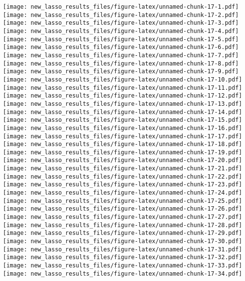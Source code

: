 \documentclass[
]{article}
\begin{document}
\texttt{[image: new\_lasso\_results\_files/figure-latex/unnamed-chunk-17-1.pdf]}
\texttt{[image: new\_lasso\_results\_files/figure-latex/unnamed-chunk-17-2.pdf]}
\texttt{[image: new\_lasso\_results\_files/figure-latex/unnamed-chunk-17-3.pdf]}
\texttt{[image: new\_lasso\_results\_files/figure-latex/unnamed-chunk-17-4.pdf]}
\texttt{[image: new\_lasso\_results\_files/figure-latex/unnamed-chunk-17-5.pdf]}
\texttt{[image: new\_lasso\_results\_files/figure-latex/unnamed-chunk-17-6.pdf]}
\texttt{[image: new\_lasso\_results\_files/figure-latex/unnamed-chunk-17-7.pdf]}
\texttt{[image: new\_lasso\_results\_files/figure-latex/unnamed-chunk-17-8.pdf]}
\texttt{[image: new\_lasso\_results\_files/figure-latex/unnamed-chunk-17-9.pdf]}
\texttt{[image: new\_lasso\_results\_files/figure-latex/unnamed-chunk-17-10.pdf]}
\texttt{[image: new\_lasso\_results\_files/figure-latex/unnamed-chunk-17-11.pdf]}
\texttt{[image: new\_lasso\_results\_files/figure-latex/unnamed-chunk-17-12.pdf]}
\texttt{[image: new\_lasso\_results\_files/figure-latex/unnamed-chunk-17-13.pdf]}
\texttt{[image: new\_lasso\_results\_files/figure-latex/unnamed-chunk-17-14.pdf]}
\texttt{[image: new\_lasso\_results\_files/figure-latex/unnamed-chunk-17-15.pdf]}
\texttt{[image: new\_lasso\_results\_files/figure-latex/unnamed-chunk-17-16.pdf]}
\texttt{[image: new\_lasso\_results\_files/figure-latex/unnamed-chunk-17-17.pdf]}
\texttt{[image: new\_lasso\_results\_files/figure-latex/unnamed-chunk-17-18.pdf]}
\texttt{[image: new\_lasso\_results\_files/figure-latex/unnamed-chunk-17-19.pdf]}
\texttt{[image: new\_lasso\_results\_files/figure-latex/unnamed-chunk-17-20.pdf]}
\texttt{[image: new\_lasso\_results\_files/figure-latex/unnamed-chunk-17-21.pdf]}
\texttt{[image: new\_lasso\_results\_files/figure-latex/unnamed-chunk-17-22.pdf]}
\texttt{[image: new\_lasso\_results\_files/figure-latex/unnamed-chunk-17-23.pdf]}
\texttt{[image: new\_lasso\_results\_files/figure-latex/unnamed-chunk-17-24.pdf]}
\texttt{[image: new\_lasso\_results\_files/figure-latex/unnamed-chunk-17-25.pdf]}
\texttt{[image: new\_lasso\_results\_files/figure-latex/unnamed-chunk-17-26.pdf]}
\texttt{[image: new\_lasso\_results\_files/figure-latex/unnamed-chunk-17-27.pdf]}
\texttt{[image: new\_lasso\_results\_files/figure-latex/unnamed-chunk-17-28.pdf]}
\texttt{[image: new\_lasso\_results\_files/figure-latex/unnamed-chunk-17-29.pdf]}
\texttt{[image: new\_lasso\_results\_files/figure-latex/unnamed-chunk-17-30.pdf]}
\texttt{[image: new\_lasso\_results\_files/figure-latex/unnamed-chunk-17-31.pdf]}
\texttt{[image: new\_lasso\_results\_files/figure-latex/unnamed-chunk-17-32.pdf]}
\texttt{[image: new\_lasso\_results\_files/figure-latex/unnamed-chunk-17-33.pdf]}
\texttt{[image: new\_lasso\_results\_files/figure-latex/unnamed-chunk-17-34.pdf]}
\end{document}
